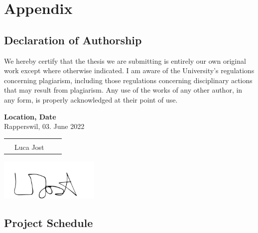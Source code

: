 \chapter{Appendix}
\clearpage

\section{Declaration of Authorship} \label{Declaration of Authorship}
We hereby certify that the thesis we are submitting is entirely our own original work except where otherwise indicated. I am aware of the University’s regulations concerning plagiarism, including those regulations concerning disciplinary actions that may result from plagiarism. Any use of the works of any other author, in any form, is properly acknowledged at their point of use.

\bigskip
\textbf{Location, Date} \\
Rapperswil, 03. June 2022

\vspace{1.2cm}
\begin{tabular}{@{}p{0.1cm}p{6cm}p{0.6cm}p{6cm}@{}}
& \hrulefill \\[-0.3em]
& Luca Jost\\
\end{tabular}

\includegraphics[width=4.8cm, align=t, smash=br, hshift=0.9cm, vshift=2.55cm]{appendix/Signature_Luca_Jost.pdf}

\newpage

\section{Project Schedule} \label{fig:project_schedule}
\enlargethispage{2.5cm}
\begin{adjustwidth}{0.23cm}{0cm} \hfuzz=7.0pt \vfuzz=20.0pt
\end{adjustwidth}
\newpage

